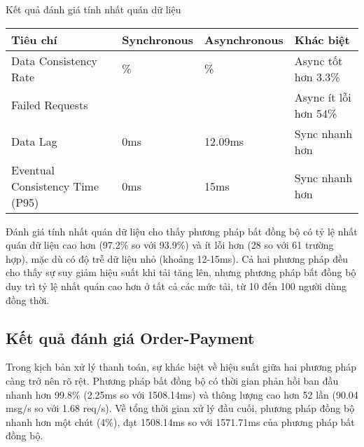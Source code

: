\begin{table}[h]{Kết quả đánh giá tính nhất quán dữ liệu}
    \centering
    {\setlength{\arrayrulewidth}{1pt}
        \renewcommand{\arraystretch}{1.5}
        \setlength{\tabcolsep}{6pt}
        \begin{tabular}{|>{\raggedright\arraybackslash}p{3.2cm}|>{\raggedright\arraybackslash}p{3.2cm}|>{\raggedright\arraybackslash}p{3.2cm}|>{\raggedright\arraybackslash}p{3.2cm}|}
            \hline
            \textbf{Tiêu chí}               & \textbf{Synchronous} & \textbf{Asynchronous} & \textbf{Khác biệt}    \\
            \hline
            Data Consistency Rate           & 93.9\%               & 97.2\%                & Async tốt hơn 3.3\%   \\
            \hline
            Failed Requests                 & 61                   & 28                    & Async ít lỗi hơn 54\% \\
            \hline
            Data Lag                        & 0ms                  & 12.09ms               & Sync nhanh hơn        \\
            \hline
            Eventual Consistency Time (P95) & 0ms                  & 15ms                  & Sync nhanh hơn        \\
            \hline
        \end{tabular}}
\end{table}

Đánh giá tính nhất quán dữ liệu cho thấy phương pháp bất đồng bộ có tỷ lệ nhất quán dữ liệu cao hơn (97.2\% so với 93.9\%) và ít lỗi hơn (28 so với 61 trường hợp), mặc dù có độ trễ dữ liệu nhỏ (khoảng 12-15ms). Cả hai phương pháp đều cho thấy sự suy giảm hiệu suất khi tải tăng lên, nhưng phương pháp bất đồng bộ duy trì tỷ lệ nhất quán cao hơn ở tất cả các mức tải, từ 10 đến 100 người dùng đồng thời.

\subsection{Kết quả đánh giá Order-Payment}
Trong kịch bản xử lý thanh toán, sự khác biệt về hiệu suất giữa hai phương pháp càng trở nên rõ rệt. Phương pháp bất đồng bộ có thời gian phản hồi ban đầu nhanh hơn 99.8\% (2.25ms so với 1508.14ms) và thông lượng cao hơn 52 lần (90.04 msg/s so với 1.68 req/s). Về tổng thời gian xử lý đầu cuối, phương pháp đồng bộ nhanh hơn một chút (4\%), đạt 1508.14ms so với 1571.71ms của phương pháp bất đồng bộ.

